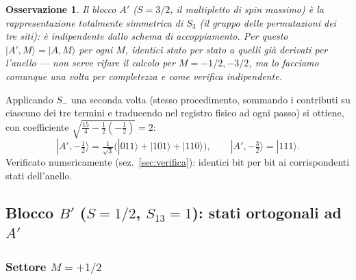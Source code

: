 \documentclass[11pt,a4paper]{article}
\newtheorem{osservazione}{Osservazione}
\begin{document}
\begin{osservazione}
Il blocco $A'$ ($S=3/2$, il multipletto di spin massimo) è la rappresentazione
totalmente simmetrica di $S_3$ (il gruppo delle permutazioni dei tre siti):
è \emph{indipendente dallo schema di accoppiamento}. Per questo
$|A',M\rangle=|A,M\rangle$ per ogni $M$, identici stato per stato a quelli
già derivati per l'anello — non serve rifare il calcolo per $M=-1/2,-3/2$,
ma lo facciamo comunque una volta per completezza e come verifica indipendente.
\end{osservazione}

Applicando $S_-$ una seconda volta (stesso procedimento, sommando i
contributi su ciascuno dei tre termini e traducendo nel registro fisico ad
ogni passo) si ottiene, con coefficiente $\sqrt{\tfrac{15}4-\tfrac12(-\tfrac12)}=2$:
\begin{equation}
|A',{-}\tfrac12\rangle = \tfrac1{\sqrt3}\big(|011\rangle+|101\rangle+|110\rangle\big),
\qquad
|A',{-}\tfrac32\rangle = |111\rangle .
\label{eq:Am12}
\end{equation}
Verificato numericamente (sez.~\ref{sec:verifica}): identici bit per bit ai
corrispondenti stati dell'anello.

\subsection{Blocco $B'$ ($S=1/2$, $S_{13}=1$): stati ortogonali ad $A'$}

\subsubsection{Settore $M={+}1/2$}
\end{document}

